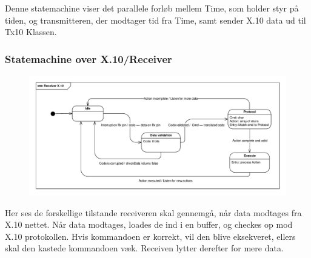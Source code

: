 \begin{landscape}
Denne statemachine viser det parallele forløb mellem Time, som holder styr på tiden, og transmitteren, der modtager tid fra Time, samt sender X.10 data ud til Tx10 Klassen.

\clearpage

\subsubsection{Statemachine over X.10/Receiver}

\begin{figure}[h]
\centering
\includegraphics[width=\textheight + 190pt,clip=true, trim=18 15 15 12]{Systemarkitektur/diagrammer/Stm_receiver_X10}
\end{figure}

Her ses de forskellige tilstande receiveren skal gennemgå, når data modtages fra X.10 nettet. Når data modtages, loades de ind i en buffer, og checkes op mod X.10 protokollen. Hvis kommandoen er korrekt, vil den blive eksekveret, ellers skal den kastede kommandoen væk. Receiven lytter derefter for mere data. 

\end{landscape}

\clearpage